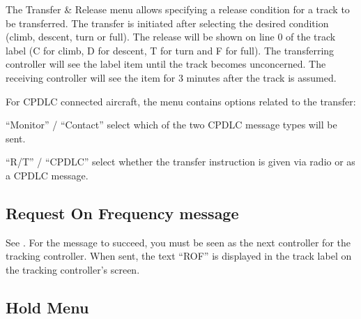 \documentclass[a4paper,oneside,11pt]{memoir}
\begin{document}
The Transfer \& Release menu allows specifying a release condition for a track to be transferred. The transfer is initiated after selecting the desired condition (climb, descent, turn or full). The release will be shown on line 0 of the track label (C for climb, D for descent, T for turn and F for full). The transferring controller will see the label item until the track becomes unconcerned. The receiving controller will see the item for 3 minutes after the track is assumed.


For CPDLC connected aircraft, the menu contains options related to the transfer:

\bigskip

“Monitor” / “Contact” select which of the two CPDLC message types will be sent.

\bigskip

“R/T” / “CPDLC” select whether the transfer instruction is given via radio or as a CPDLC message.


\subsection{Request On Frequency message}
\label{menu:rof}

See . For the message to succeed, you must be seen as the next controller for the tracking controller. When sent, the text “ROF” is displayed in the track label on the tracking controller’s screen.


\subsection{Hold Menu}
\label{menu:hold}
\end{document}
